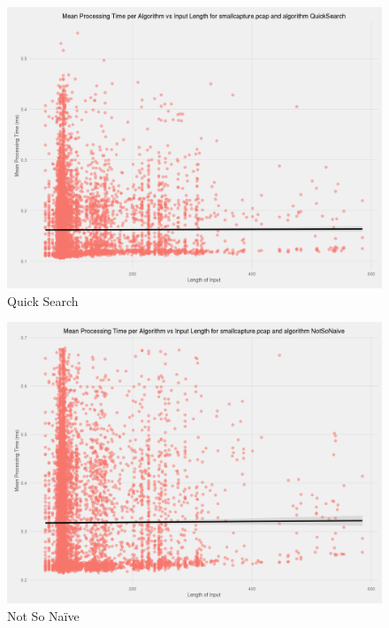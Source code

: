 \documentclass[9pt, technote]{IEEEtran}
\begin{document}
\begin{figure}[!hbt]
  \centering
  \includegraphics[width=\columnwidth]{images/scatter_mean_vs_input_length_QuickSearch}
  \caption{Quick Search}
\end{figure}

\begin{figure}[!hbt]
  \centering
  \includegraphics[width=\columnwidth]{images/scatter_mean_vs_input_length_NotSoNaive}
  \caption{Not So Na\"ive}
\end{figure}
\end{document}
